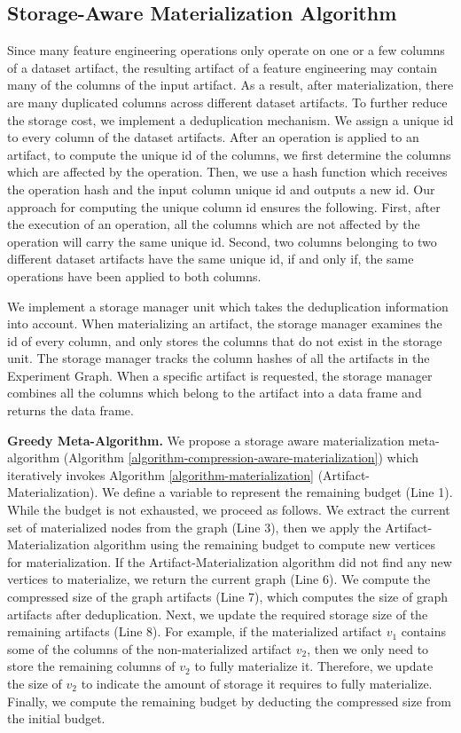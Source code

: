 \subsection{Storage-Aware Materialization Algorithm}
Since many feature engineering operations only operate on one or a few columns of a dataset artifact, the resulting artifact of a feature engineering may contain many of the columns of the input artifact.
As a result, after materialization, there are many duplicated columns across different dataset artifacts.
To further reduce the storage cost, we implement a deduplication mechanism.
We assign a unique id to every column of the dataset artifacts.
After an operation is applied to an artifact, to compute the unique id of the columns, we first determine the columns which are affected by the operation.
Then, we use a hash function which receives the operation hash and the input column unique id and outputs a new id.
Our approach for computing the unique column id ensures the following.
First, after the execution of an operation, all the columns which are not affected by the operation will carry the same unique id.
Second, two columns belonging to two different dataset artifacts have the same unique id, if and only if, the same operations have been applied to both columns.

We implement a storage manager unit which takes the deduplication information into account.
When materializing an artifact, the storage manager examines the id of every column, and only stores the columns that do not exist in the storage unit.
The storage manager tracks the column hashes of all the artifacts in the Experiment Graph.
When a specific artifact is requested, the storage manager combines all the columns which belong to the artifact into a data frame and returns the data frame.

\textbf{Greedy Meta-Algorithm.}
We propose a storage aware materialization meta-algorithm (Algorithm \ref{algorithm-compression-aware-materialization}) which iteratively invokes Algorithm \ref{algorithm-materialization} (Artifact-Materialization).
We define a variable to represent the remaining budget (Line 1).
While the budget is not exhausted, we proceed as follows.
We extract the current set of materialized nodes from the graph (Line 3), then we apply the Artifact-Materialization algorithm using the remaining budget to compute new vertices for materialization.
If the Artifact-Materialization algorithm did not find any new vertices to materialize, we return the current graph (Line 6).
We compute the compressed size of the graph artifacts (Line 7), which computes the size of graph artifacts after deduplication. 
Next, we update the required storage size of the remaining artifacts (Line 8).
For example, if the materialized artifact $v_1$ contains some of the columns of the non-materialized artifact $v_2$, then we only need to store the remaining columns of $v_2$ to fully materialize it.
Therefore, we update the size of $v_2$ to indicate the amount of storage it requires to fully materialize.
Finally, we compute the remaining budget by deducting the compressed size from the initial budget.

